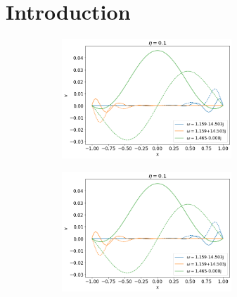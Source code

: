 \chapter{Introduction}

\begin{figure}
    \begin{subfigure}[b]{0.5\textwidth}
        \includegraphics*[width=0.7\textwidth]{./img/constant_v/eigenfuncs-eta=0.1.png}
    \end{subfigure}%
    \begin{subfigure}[b]{0.5\textwidth}
        \includegraphics*[width=0.7\textwidth]{./img/constant_v/eigenfuncs-eta=0.1.png}
    \end{subfigure}
\end{figure}
